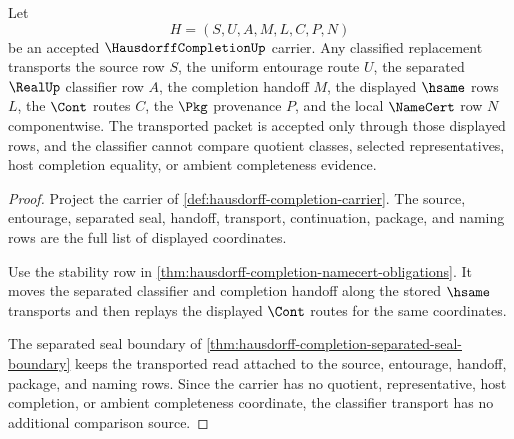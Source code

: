\begin{theorem}
\label{thm:hausdorff-completion-classifier-transport}
Let
$$
H=(S,U,A,M,L,C,P,N)
$$
be an accepted $\HausdorffCompletionUp$ carrier. Any classified replacement transports the source row $S$, the uniform entourage route $U$, the separated $\RealUp$ classifier row $A$, the completion handoff $M$, the displayed $\hsame$ rows $L$, the $\Cont$ routes $C$, the $\Pkg$ provenance $P$, and the local $\NameCert$ row $N$ componentwise. The transported packet is accepted only through those displayed rows, and the classifier cannot compare quotient classes, selected representatives, host completion equality, or ambient completeness evidence.
\end{theorem}
\begin{proof}
Project the carrier of \autoref{def:hausdorff-completion-carrier}. The source, entourage, separated seal, handoff, transport, continuation, package, and naming rows are the full list of displayed coordinates.

Use the stability row in \autoref{thm:hausdorff-completion-namecert-obligations}. It moves the separated classifier and completion handoff along the stored $\hsame$ transports and then replays the displayed $\Cont$ routes for the same coordinates.

The separated seal boundary of \autoref{thm:hausdorff-completion-separated-seal-boundary} keeps the transported read attached to the source, entourage, handoff, package, and naming rows. Since the carrier has no quotient, representative, host completion, or ambient completeness coordinate, the classifier transport has no additional comparison source.
\end{proof}

